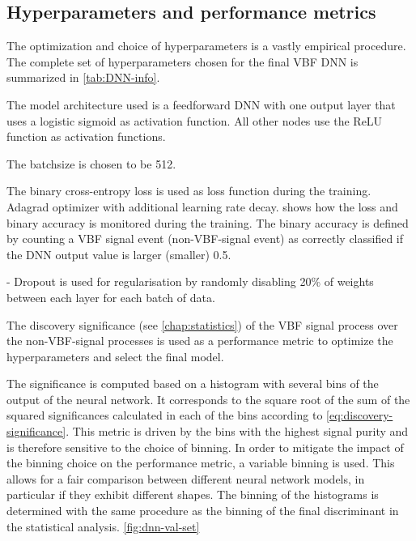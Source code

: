 \subsection{Hyperparameters and performance metrics}
\label{subsec:hyper-parameters}
The optimization and choice of hyperparameters is a vastly empirical procedure.
The complete set of hyperparameters chosen for the final VBF DNN is summarized in \cref{tab:DNN-info}. 

The model architecture used is a feedforward DNN with one output layer that uses a logistic sigmoid as activation function. All other nodes use the ReLU function as activation functions. 

The batchsize is chosen to be 512.

The binary cross-entropy loss is used as loss function during the training.
Adagrad optimizer with additional learning rate decay.
 shows how the loss and binary accuracy is monitored during the training. The binary accuracy is defined by counting a VBF signal event (non-VBF-signal event) as correctly classified if the DNN output value is larger (smaller) 0.5.

- Dropout is used for regularisation by randomly disabling 20\% of weights between each layer for each batch of data. 

The discovery significance (see \cref{chap:statistics}) of the VBF signal process over the non-VBF-signal processes is used as a performance metric to optimize the hyperparameters and select the final model.

The significance is computed based on a histogram with several bins of the output of the neural network. It corresponds to the square root of the sum of the squared significances calculated in each of the bins according to \cref{eq:discovery-significance}. 
This metric is driven by the bins with the highest signal purity and is therefore sensitive to the choice of binning. In order to mitigate the impact of the binning choice on the performance metric, a variable binning is used. This allows for a fair comparison between different neural network models, in particular if they exhibit different shapes. The binning of the histograms is determined with the same procedure as the binning of the final discriminant in the statistical analysis. 
\cref{fig:dnn-val-set}

